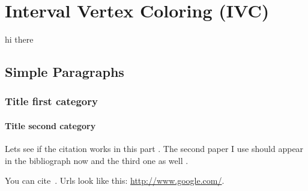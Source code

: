 \section{Interval Vertex Coloring (IVC)}
  \begin{frame}[fragile]
    hi there
  \end{frame}

  \subsection[Paragraphs]{Simple Paragraphs}
  \begin{frame}[fragile]
    \frametitle{Title first category}
    \framesubtitle{Title second category}
  
    Lets see if the citation works in this part \cite{main_paper}. The second paper I use
    should appear in the bibliograph now \cite{kernel_estimation_1} and the third one as well
    \cite{kernel_estimation_2}.
  
    You can cite~\cite{Tan11}. Urls look like this: \url{http://www.google.com/}.
  \end{frame}